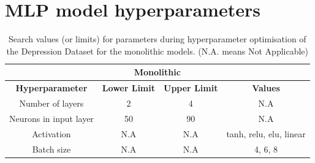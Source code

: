 \section{MLP model hyperparameters}
\label{sec:mlp_hyperparameters}

\begin{table}[htbp]
   \centering
   \caption{Search values (or limits) for parameters during hyperparameter optimisation of the Depression Dataset for the monolithic models. (N.A. means Not Applicable)}
   \label{tab:optimiser_values}
   \begin{tabular}{|c|ccc|}
     \hline
     \multicolumn{4}{|c|}{\textbf{Monolithic}} \\
     \hline
     \textbf{Hyperparameter} & \textbf{Lower Limit} & \textbf{Upper Limit} & \textbf{Values} \\
     \hline
     Number of layers & 2 & 4 & N.A \\
     Neurons in input layer & 50 & 90 & N.A \\
     Activation & N.A & N.A & tanh, relu, elu, linear \\
     Batch size & N.A & N.A & 4, 6, 8 \\
     \hline
   \end{tabular}
\end{table}

